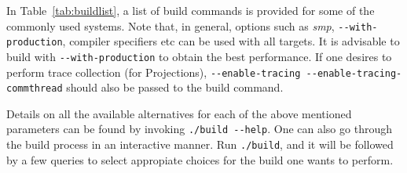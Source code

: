 In Table~\ref{tab:buildlist}, a list of build commands is provided for some of the commonly 
used systems. Note that, in general, options such as {\em smp},
\verb|--with-production|, compiler specifiers etc can be used with all targets.
It is advisable to build with \verb|--with-production| to obtain the best
performance.  If one desires to perform trace collection (for Projections),
\verb|--enable-tracing --enable-tracing-commthread| should also be passed to the
build command.

Details on all the available alternatives for each of the above mentioned
parameters can be found by invoking \verb|./build --help|. One can also go through the
build process in an interactive manner. Run \verb|./build|, and it will be followed by
a few queries to select appropiate choices for the build one wants to perform.


